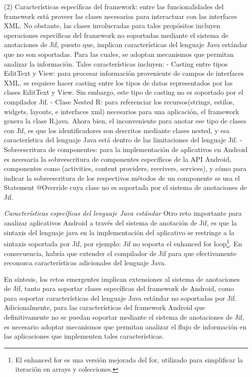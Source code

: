 (2) Características específicas del framework: entre las funcionalidades del
framework está proveer las clases necesarias para interactuar con las interfaces
XML. No obstante, las clases involucradas para tales propósitos incluyen
operaciones específicas del framework no soportadas mediante el sistema de
anotaciones de Jif, puesto que, implican características del lenguaje Java
estándar que no son soportadas. Para las cuales, se adoptan mecanismos que
permitan analizar la información. Tales características incluyen:\newline 
- Casting entre tipos EditText y View: para procesar información proveniente de
campos de interfaces XML, se requiere hacer casting entre los tipos de datos representados por las clases EditText y
View. Sin embargo, este tipo de casting no es soportado por el compilador
Jif.\newline 
- Clase Nested R: para referenciar los
recursos(strings, estilos, widgets, layouts, e interfaces xml) necesarios para
una aplicación, el framework genera la clase R.java. Ahora bien, el
inconveniente para anotar ese tipo de clases con Jif, es que los identificadores
son descritos mediante clases nested, y esa característica del lenguaje Java
está dentro de las limitaciones del lenguaje Jif.\newline 
- Sobreescritura de componentes: para la implementación de aplicativos en Android es necesaria la
sobreescritura de componentes específicos de la API Android, componentes como
(activities, content providers, receivers, services), y cómo para indicar la
sobreescritura de los respectivos métodos de un componente se usa el
Statement @Override cuya clase no es soportada por el sistema de anotaciones de
Jif.

\emph{Características específicas del lenguaje Java estándar}\newline
Otro reto importante para analizar aplicativos Android a través del sistema de
anotación de Jif, es que la sintaxis del lenguaje java en la implementación del
aplicativo se restringe a la sintaxis soportada por Jif, por ejemplo: Jif no
soporta el enhanced for loop\footnote{El enhanced for es una versión mejorada
del for, utilizado para simplificar la iteración en arrays y colecciones.}.
En consecuencia, habría que extender el compilador de Jif para que efectivamente reconozca características
adicionales del lenguaje Java.

En síntesis, los retos emergentes implican extensiones al sistema de
anotaciones de Jif, tanto para soportar clases específicas del framework de
Android, como para soportar características del lenguaje Java estándar no
soportadas por Jif.\newline
Adicionalmente, para las características del framework Android que
definitivamente no se puedan soportar mediante el sistema de anotaciones de Jif,
es necesario adoptar mecanismos que permitan analizar el flujo de información en
las aplicaciones que implementen tales características.\newline

